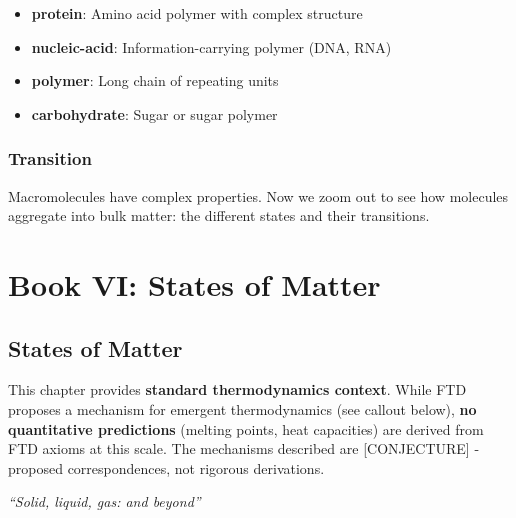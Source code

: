 \documentclass[
  11pt,
  letterpaper,
  twoside,
  openright]{book}
\providecommand{\tightlist}{%
  \setlength{\itemsep}{0pt}\setlength{\parskip}{0pt}}
\begin{document}
\begin{itemize}
\tightlist
\item
  \textbf{protein}: Amino acid polymer with complex structure
\item
  \textbf{nucleic-acid}: Information-carrying polymer (DNA, RNA)
\item
  \textbf{polymer}: Long chain of repeating units
\item
  \textbf{carbohydrate}: Sugar or sugar polymer
\end{itemize}

\section{Transition}\label{transition-7}

Macromolecules have complex properties. Now we zoom out to see how
molecules aggregate into bulk matter: the different states and their
transitions.

\part{Book VI: States of Matter}

\chapter{States of Matter}\label{sec-states-matter}

\begin{tcolorbox}[enhanced jigsaw, coltitle=black, colbacktitle=quarto-callout-warning-color!10!white, toprule=.15mm, colframe=quarto-callout-warning-color-frame, arc=.35mm, opacityback=0, bottomtitle=1mm, toptitle=1mm, breakable, colback=white, titlerule=0mm, opacitybacktitle=0.6, title=\textcolor{quarto-callout-warning-color}{\faExclamationTriangle}\hspace{0.5em}{Pedagogical Context {[}NOT DERIVED FROM FTD{]}}, rightrule=.15mm, bottomrule=.15mm, leftrule=.75mm, left=2mm]

This chapter provides \textbf{standard thermodynamics context}. While
FTD proposes a mechanism for emergent thermodynamics (see callout
below), \textbf{no quantitative predictions} (melting points, heat
capacities) are derived from FTD axioms at this scale. The mechanisms
described are {[}CONJECTURE{]} - proposed correspondences, not rigorous
derivations.

\end{tcolorbox}

\emph{``Solid, liquid, gas: and beyond''}
\end{document}

